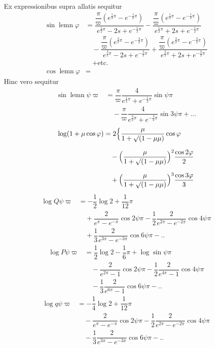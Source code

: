 Ex expressionibus supra allatis sequitur
\[
\begin{aligned}
\sin\operatorname{lemn}\varphi
&=\dfrac{\dfrac{\pi}{\varpi}(e^{\frac12\pi}-e^{-\frac12\pi})}
        {e^{\frac12\pi}-2s+e^{-\frac12\pi}}
 -\dfrac{\dfrac{\pi}{\varpi}(e^{\frac12\pi}-e^{-\frac12\pi})}
        {e^{\frac12\pi}+2s+e^{-\frac12\pi}}\\[5pt]
&\quad-\dfrac{\dfrac{\pi}{\varpi}(e^{\frac32\pi}-e^{-\frac32\pi})}
        {e^{\frac32\pi}-2s+e^{-\frac32\pi}}
 +\dfrac{\dfrac{\pi}{\varpi}(e^{\frac32\pi}-e^{-\frac32\pi})}
        {e^{\frac32\pi}+2s+e^{-\frac32\pi}}\\[5pt]
&\quad+\text{etc.}\\[5pt]
\cos\operatorname{lemn}\varphi&= 
\end{aligned}
\]
Hinc vero sequitur
\[
\begin{aligned}\sin\operatorname{lemn}\psi\varpi
&=\dfrac{\pi}{\varpi}\dfrac{4}{e^{\frac12\pi}+e^{-\frac12\pi}}\sin\psi\pi
\\[7pt]&\quad{}-\dfrac{\pi}{\varpi}\dfrac{4}{e^{\frac32\pi}+e^{-\frac32\pi}}\sin3\psi\pi
+\mathord{.}\mathord{.}\mathord{.}\end{aligned}
\]
\[
\begin{aligned}\log(1+\mu\cos\varphi)
&=2\Bigl\{\dfrac{\mu}{1+\surd(1-\mu\mu)}\cos\varphi
\\[7pt]&\quad{}-\Bigl(\dfrac{\mu}{1+\surd(1-\mu\mu)}\Bigr)^{2}\dfrac{\cos2\varphi}{2}
\\[7pt]&\quad{}+\Bigl(\dfrac{\mu}{1+\surd(1-\mu\mu)}\Bigr)^{3}\dfrac{\cos3\varphi}{3}\end{aligned}
\]
\[
\begin{aligned}
\log Q\psi\varpi&=-\dfrac12\log2+\dfrac1{12}\pi\\[5pt]
&\quad+\dfrac{2}{e^{\pi}-e^{-\pi}}\cos2\psi\pi
-\dfrac12\dfrac{2}{e^{2\pi}-e^{-2\pi}}\cos4\psi\pi
\\[7pt]&\quad{}+\dfrac13\dfrac{2}{e^{3\pi}-e^{-3\pi}}\cos6\psi\pi-\mathord{.}\mathord{.}
\end{aligned}
\]
\[
\begin{aligned}
\log P\psi\varpi&=\dfrac12\log2-\dfrac16\pi+\log\sin\psi\pi\\[5pt]
&\quad-\dfrac{2}{e^{2\pi}-1}\cos2\psi\pi
-\dfrac12\dfrac{2}{e^{4\pi}-1}\cos4\psi\pi
\\[7pt]&\quad{}-\dfrac13\dfrac{2}{e^{6\pi}-1}\cos6\psi\pi-\mathord{.}\mathord{.}
\end{aligned}
\]
\[
\begin{aligned}
\log q\psi\varpi&=-\dfrac14\log2+\dfrac1{12}\pi\\[5pt]
&\quad-\dfrac{2}{e^{\pi}-e^{-\pi}}\cos2\psi\pi
-\dfrac12\dfrac{2}{e^{2\pi}-e^{-2\pi}}\cos4\psi\pi
\\[7pt]&\quad{}-\dfrac13\dfrac{2}{e^{3\pi}-e^{-3\pi}}\cos6\psi\pi-\mathord{.}\mathord{.}
\end{aligned}
\]
